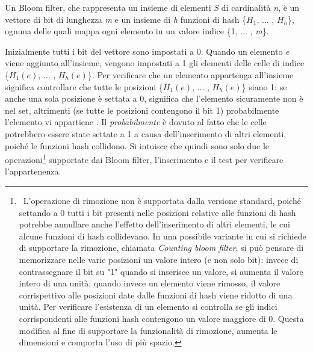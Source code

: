 \documentclass[../main.tex]{subfiles}
\begin{document}
\theoremstyle{definition}
\begin{definition} 

Un Bloom filter, che rappresenta un insieme di elementi \textit{S} di cardinalità \textit{n}, è un vettore di bit di lunghezza \textit{m} e un insieme di \textit{h} funzioni di hash \{$H_{1}$, ... , $H_{h}$\}, ognuna delle quali mappa ogni elemento in un valore indice \{1, ... , \textit{m}\}. 

\end{definition}

\noindent
Inizialmente tutti i bit del vettore sono impostati a 0. Quando un elemento \textit{e} viene aggiunto all'insieme, vengono impostati a 1 gli elementi delle celle di indice \{$H_{1}(e)$, ... , $H_{h}(e)$\}. Per verificare che un elemento appartenga all'insieme significa controllare che tutte le posizioni \{$H_{1}(e)$, ... , $H_{h}(e)$\} siano 1: se anche una sola posizione è settata a 0, significa che l'elemento sicuramente non è nel set, altrimenti (se tutte le posizioni contengono il bit 1) probabilmente l'elemento vi appartiene \cite{compressedbloomfilter}. Il \textit{probabilmente} è dovuto al fatto che le celle potrebbero essere state settate a 1 a causa dell'inserimento di altri elementi, poiché le funzioni hash collidono. Si intuisce che quindi sono solo due le operazioni\footnote{\ L'operazione di rimozione non è supportata dalla versione standard, poiché settando a 0 tutti i bit presenti nelle posizioni relative alle funzioni di hash potrebbe annullare anche l'effetto dell'inserimento di altri elementi, le cui alcune funzioni di hash collidevano. In una possibile variante in cui si richiede di supportare la rimozione, chiamata \textit{Counting bloom filter}, si può pensare di memorizzare nelle varie posizioni un valore intero (e non solo bit): invece di contrassegnare il bit su "1" quando si inserisce un valore, si aumenta il valore intero di una unità; quando invece un elemento viene rimosso, il valore corrispettivo alle posizioni date dalle funzioni di hash viene ridotto di una unità. Per verificare l'esistenza di un elemento si controlla se gli indici corrispondenti alle funzioni hash contengono un valore maggiore di 0. Questa modifica al fine di supportare la funzionalità di rimozione, aumenta le dimensioni e comporta l'uso di più spazio.} supportate dai Bloom filter, l'inserimento e il test per verificare l'appartenenza.
\end{document}
